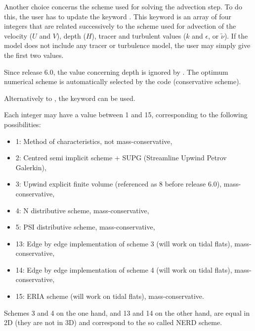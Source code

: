 Another choice concerns the scheme used for solving the advection step.
To do this, the user has to update the keyword .
This keyword is an array of four integers that are related successively
to the scheme used for advection of the velocity ($U$ and $V$), depth ($H$),
tracer and turbulent values ($k$ and $\epsilon$, or $\tilde{\nu}$).
If the model does not include any tracer or turbulence model,
the user may simply give the first two values.

Since release 6.0, the value concerning depth is ignored by .
The optimum numerical scheme is automatically selected by the code
(conservative scheme).

Alternatively to , the keyword
 can be used.

Each integer may have a value between 1 and 15, corresponding to the following
possibilities:

\begin{itemize}
\item 1: Method of characteristics, not mass-conservative,

\item 2: Centred semi implicit scheme + SUPG
(Streamline Upwind Petrov Galerkin),

\item 3: Upwind explicit finite volume
(referenced as 8 before release 6.0), mass-conservative,

\item 4: N distributive scheme, mass-conservative,

\item 5: PSI distributive scheme, mass-conservative,
%

\item 13: Edge by edge implementation of scheme 3
(will work on tidal flats), mass-conservative,

\item 14: Edge by edge implementation of scheme 4
(will work on tidal flats), mass-conservative,

\item 15: ERIA scheme (will work on tidal flats), mass-conservative.
\end{itemize}

Schemes 3 and 4 on the one hand, and 13 and 14 on the other hand, are equal
in 2D (they are not in 3D) and correspond to the so called NERD scheme.


